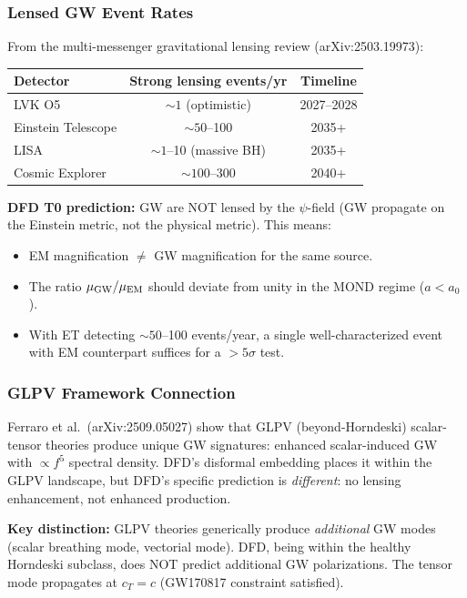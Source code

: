 \documentclass[11pt]{article}
\newcommand{\aM}{a_0}
\begin{document}
\subsubsection{Lensed GW Event Rates}

From the multi-messenger gravitational lensing review
(arXiv:2503.19973):
\begin{center}
\begin{tabular}{lcc}
\toprule
\textbf{Detector} & \textbf{Strong lensing events/yr} & \textbf{Timeline} \\
\midrule
LVK O5 & $\sim 1$ (optimistic) & 2027--2028 \\
Einstein Telescope & $\sim 50$--100 & 2035+ \\
LISA & $\sim 1$--10 (massive BH) & 2035+ \\
Cosmic Explorer & $\sim 100$--300 & 2040+ \\
\bottomrule
\end{tabular}
\end{center}

\textbf{DFD T0 prediction:} GW are NOT lensed by the $\psi$-field
(GW propagate on the Einstein metric, not the physical metric).
This means:
\begin{itemize}
  \item EM magnification $\neq$ GW magnification for the same source.
  \item The ratio $\mu_{\rm GW}/\mu_{\rm EM}$ should deviate from
    unity in the MOND regime ($a < \aM$).
  \item With ET detecting $\sim 50$--100 events/year, a single
    well-characterized event with EM counterpart suffices for
    a $> 5\sigma$ test.
\end{itemize}

\subsubsection{GLPV Framework Connection}

Ferraro et al.\ (arXiv:2509.05027) show that GLPV (beyond-Horndeski)
scalar-tensor theories produce unique GW signatures: enhanced
scalar-induced GW with $\propto f^5$ spectral density. DFD's disformal
embedding places it within the GLPV landscape, but DFD's specific
prediction is \emph{different}: no lensing enhancement, not enhanced
production.

\textbf{Key distinction:} GLPV theories generically produce
\emph{additional} GW modes (scalar breathing mode, vectorial mode).
DFD, being within the healthy Horndeski subclass, does NOT predict
additional GW polarizations. The tensor mode propagates at $c_T = c$
(GW170817 constraint satisfied).
\end{document}
